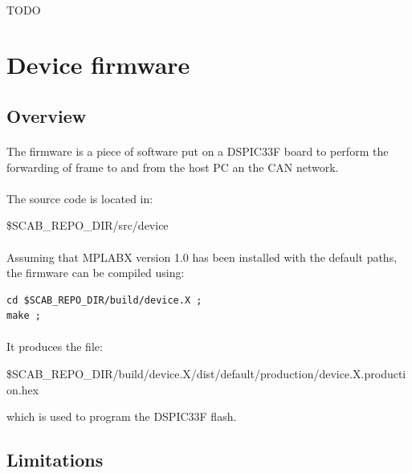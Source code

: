 \documentclass[a4paper, 11pt]{article}
\begin{document}
\paragraph{}
TODO

\newpage
\section{Device firmware}

\subsection{Overview}
\paragraph{}
The firmware is a piece of software put on a DSPIC33F board to perform the forwarding
of frame to and from the host PC an the CAN network.

\paragraph{}
The source code is located in:
\begin{center}
\$SCAB\_REPO\_DIR/src/device
\end{center}

\paragraph{}
Assuming that MPLABX version 1.0 has been installed with the default paths, the firmware
can be compiled using:\\
\begin{small}
\lstset{language=C}
\begin{lstlisting}[frame=tb]
cd $SCAB_REPO_DIR/build/device.X ;
make ;
\end{lstlisting}
\end{small}

\paragraph{}
It produces the file:
\begin{center}
\$SCAB\_REPO\_DIR/build/device.X/dist/default/production/device.X.production.hex
\end{center}
which is used to program the DSPIC33F flash.

\subsection{Limitations}
\end{document}
